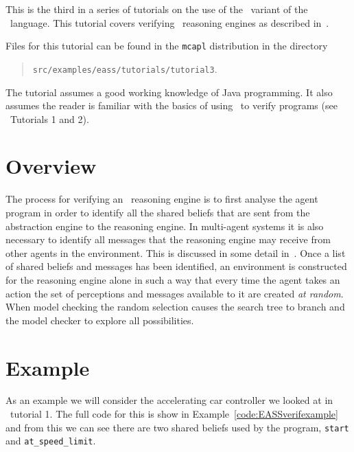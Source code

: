 
This is the third in a series of tutorials on the use of the \eass\ variant of the \gwendolen\ language.  This tutorial covers verifying \eass\ reasoning engines as described in~\cite{dennis14:_pract,DBLP:journals/cacm/FisherDW13}.

Files for this tutorial can be found in the \texttt{mcapl} distribution in the directory 
\begin{quote}
\texttt{src/examples/eass/tutorials/tutorial3}.
\end{quote}

The tutorial assumes a good working knowledge of Java programming.  It also assumes the reader is familiar with the basics of using \ajpf\ to verify programs (see \ajpf\ Tutorials 1 and 2).

\section{Overview}
The process for verifying an \eass\ reasoning engine is to first analyse the agent program in order to identify all the shared beliefs that are sent from the abstraction engine to the reasoning engine.  In multi-agent systems it is also necessary to identify all messages that the reasoning engine may receive from other agents in the environment.  This is discussed in some detail in~\cite{dennis14:_pract}.  Once a list of shared beliefs and messages has been identified, an environment is constructed for the reasoning engine alone in such a way that every time the agent takes an action the set of perceptions and messages available to it are created \emph{at random}.  When model checking the random selection causes the search tree to branch and the model checker to explore all possibilities.

\section{Example}
As an example we will consider the accelerating car controller we looked at in \eass\ tutorial 1.  The full code for this is show in Example~\ref{code:EASSverifexample} and from this we can see there are two shared beliefs used by the program, \lstinline{start} and \lstinline{at_speed_limit}.


